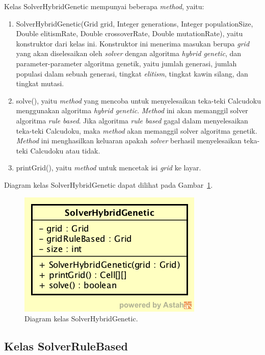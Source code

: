 Kelas SolverHybridGenetic mempunyai beberapa \textit{method}, yaitu:

\begin{enumerate}
\item SolverHybridGenetic(Grid grid,  Integer generations, Integer populationSize, Double elitismRate, Double crossoverRate, Double mutationRate), yaitu konstruktor dari kelas ini. Konstruktor ini menerima masukan berupa \textit{grid} yang akan diselesaikan oleh \textit{solver} dengan algoritma \textit{hybrid genetic}, dan parameter-parameter algoritma genetik, yaitu jumlah generasi, jumlah populasi dalam sebuah generasi, tingkat \textit{elitism}, tingkat kawin silang, dan tingkat mutasi.
\item solve(), yaitu \textit{method} yang mencoba untuk menyelesaikan teka-teki Calcudoku menggunakan algoritma \textit{hybrid genetic}. \textit{Method} ini akan memanggil solver algoritma \textit{rule based}. Jika algoritma \textit{rule based} gagal dalam menyelesaikan teka-teki Calcudoku, maka \textit{method} akan memanggil solver algoritma genetik. \textit{Method} ini menghasilkan keluaran apakah \textit{solver} berhasil menyelesaikan teka-teki Calcudoku atau tidak.
\item printGrid(), yaitu \textit{method} untuk mencetak isi \textit{grid} ke layar.
\end{enumerate}

Diagram kelas SolverHybridGenetic dapat dilihat pada Gambar~\ref{fig:diagramkelassolverhg}.

\begin{figure}
\centering
\captionsetup{justification=centering}
\includegraphics[scale=0.5]{Gambar/Perancangan/DiagramKelasSolverHybridGenetic.png}
\caption[Diagram kelas SolverHybridGenetic.]{Diagram kelas SolverHybridGenetic.}
\label{fig:diagramkelassolverhg}
\end{figure}

\subsection{Kelas SolverRuleBased}
\label{sec:kelassolverrb}

